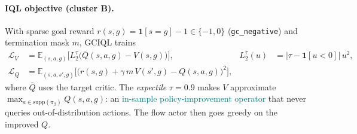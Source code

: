 \documentclass[11pt]{article}
\newcommand{\E}{\mathbb{E}}
\newcommand{\Ind}{\mathbf{1}}
\newcommand{\Lexp}{L^{\tau}_2}                       %
\newcommand{\good}[1]{\textcolor{teal}{#1}}
\begin{document}
\paragraph{IQL objective (cluster B).}
With sparse goal reward $r(s,g)=\Ind[s=g]-1\in\{-1,0\}$ (\texttt{gc\_negative})
and termination mask $m$, GCIQL trains
\begin{align}
  \mathcal{L}_{V}
    &= \E_{(s,a,g)}\!\big[\Lexp\!\big(\bar Q(s,a,g)-V(s,g)\big)\big],
    &\Lexp(u) &= \big|\tau-\Ind[u<0]\big|\,u^{2},
    \label{eq:iql-v}\\[2pt]
  \mathcal{L}_{Q}
    &= \E_{(s,a,s',g)}\!\big[\big(r(s,g)+\gamma\,m\,V(s',g)-Q(s,a,g)\big)^{2}\big],
    \label{eq:iql-q}
\end{align}
where $\bar Q$ uses the target critic. The \emph{expectile} $\tau=0.9$ makes $V$
approximate $\max_{a\in\mathrm{supp}(\pi_\beta)}Q(s,a,g)$: an \good{in-sample
policy-improvement operator} that never queries out-of-distribution actions.
The flow actor then goes greedy on the improved $Q$.
\end{document}
